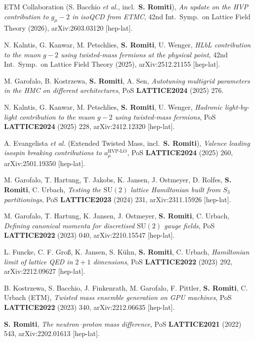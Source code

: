 \begin{enumerate}[leftmargin=1.6em,labelsep=0.5em,label={[C\arabic*]},itemsep=2pt,topsep=3pt]
  \item \label{pub:hvpupdate} ETM Collaboration (S. Bacchio \textit{et al.}, incl.\ \textbf{S. Romiti}), \textit{An update on the HVP contribution to $g_\mu-2$ in isoQCD from ETMC}, 42nd Int.\ Symp.\ on Lattice Field Theory (2026), arXiv:2603.03120 [hep-lat].
  \item \label{pub:hlbl} N. Kalntis, G. Kanwar, M. Petschlies, \textbf{S. Romiti}, U. Wenger, \textit{HLbL contribution to the muon $g-2$ using twisted-mass fermions at the physical point}, 42nd Int.\ Symp.\ on Lattice Field Theory (2025), arXiv:2512.21155 [hep-lat].
  \item \label{pub:multigrid} M. Garofalo, B. Kostrzewa, \textbf{S. Romiti}, A. Sen, \textit{Autotuning multigrid parameters in the HMC on different architectures}, PoS \textbf{LATTICE2024} (2025) 276.
  \item N. Kalntis, G. Kanwar, M. Petschlies, \textbf{S. Romiti}, U. Wenger, \textit{Hadronic light-by-light contribution to the muon $g-2$ using twisted-mass fermions}, PoS \textbf{LATTICE2024} (2025) 228, arXiv:2412.12320 [hep-lat].
  \item A. Evangelista \textit{et al.} (Extended Twisted Mass, incl.\ \textbf{S. Romiti}), \textit{Valence leading isospin breaking contributions to $a_\mu^{\mathrm{HVP\text{-}LO}}$}, PoS \textbf{LATTICE2024} (2025) 260, arXiv:2501.19350 [hep-lat].
  \item M. Garofalo, T. Hartung, T. Jakobs, K. Jansen, J. Ostmeyer, D. Rolfes, \textbf{S. Romiti}, C. Urbach, \textit{Testing the $\mathrm{SU}(2)$ lattice Hamiltonian built from $S_3$ partitionings}, PoS \textbf{LATTICE2023} (2024) 231, arXiv:2311.15926 [hep-lat].
  \item M. Garofalo, T. Hartung, K. Jansen, J. Ostmeyer, \textbf{S. Romiti}, C. Urbach, \textit{Defining canonical momenta for discretised $\mathrm{SU}(2)$ gauge fields}, PoS \textbf{LATTICE2022} (2023) 040, arXiv:2210.15547 [hep-lat].
  \item L. Funcke, C. F. Gro\ss{}, K. Jansen, S. K\"uhn, \textbf{S. Romiti}, C. Urbach, \textit{Hamiltonian limit of lattice QED in $2+1$ dimensions}, PoS \textbf{LATTICE2022} (2023) 292, arXiv:2212.09627 [hep-lat].
  \item \label{pub:gpuensemble} B. Kostrzewa, S. Bacchio, J. Finkenrath, M. Garofalo, F. Pittler, \textbf{S. Romiti}, C. Urbach (ETM), \textit{Twisted mass ensemble generation on GPU machines}, PoS \textbf{LATTICE2022} (2023) 340, arXiv:2212.06635 [hep-lat].
  \item \label{pub:nptalk} \textbf{S. Romiti}, \textit{The neutron--proton mass difference}, PoS \textbf{LATTICE2021} (2022) 543, arXiv:2202.01613 [hep-lat].
\end{enumerate}

